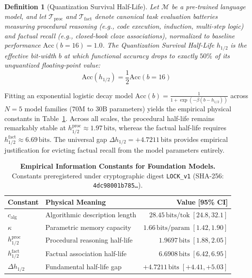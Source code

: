 \documentclass[10pt,twocolumn,letterpaper]{article}
\newtheorem{definition}{Definition}
\begin{document}
\begin{definition}[Quantization Survival Half-Life]
Let $\mathcal{M}$ be a pre-trained language model, and let $\mathcal{T}_{\text{proc}}$ and $\mathcal{T}_{\text{fact}}$ denote canonical task evaluation batteries measuring procedural reasoning (e.g., code execution, induction, multi-step logic) and factual recall (e.g., closed-book cloze associations), normalized to baseline performance $\text{Acc}(b=16) = 1.0$. The Quantization Survival Half-Life $h_{1/2}$ is the effective bit-width $b$ at which functional accuracy drops to exactly $50\%$ of its unquantized floating-point value:
\begin{equation}
    \text{Acc}(h_{1/2}) = \frac{1}{2} \text{Acc}(b=16)
\end{equation}
\end{definition}

Fitting an exponential logistic decay model $\text{Acc}(b) = \frac{1}{1 + \exp(-\beta(b - h_{1/2}))}$ across $N=5$ model families ($70\text{M}$ to $30\text{B}$ parameters) yields the empirical physical constants in Table~\ref{tab:constants}. Across all scales, the procedural half-life remains remarkably stable at $h_{1/2}^{\text{proc}} \approx 1.97\,\text{bits}$, whereas the factual half-life requires $h_{1/2}^{\text{fact}} \approx 6.69\,\text{bits}$. The universal gap $\Delta h_{1/2} = +4.7211\,\text{bits}$ provides empirical justification for evicting factual recall from the model parameters entirely.

\begin{table}[h]
\centering
\small
\caption{\textbf{Empirical Information Constants for Foundation Models.} Constants preregistered under cryptographic digest \texttt{LOCK\_v1} (SHA-256: \texttt{4dc98001b785\dots}).}
\label{tab:constants}
\begin{tabularx}{\columnwidth}{l X r}
\toprule
\textbf{Constant} & \textbf{Physical Meaning} & \textbf{Value [95\% CI]} \\
\midrule
$c_{\text{alg}}$ & Algorithmic description length & $28.45\,\text{bits/tok}\; [24.8, 32.1]$ \\
$\kappa$ & Parametric memory capacity & $1.66\,\text{bits/param}\; [1.42, 1.90]$ \\
$h_{1/2}^{\text{proc}}$ & Procedural reasoning half-life & $1.9697\,\text{bits}\; [1.88, 2.05]$ \\
$h_{1/2}^{\text{fact}}$ & Factual association half-life & $6.6908\,\text{bits}\; [6.42, 6.95]$ \\
$\Delta h_{1/2}$ & Fundamental half-life gap & $+4.7211\,\text{bits}\; [+4.41, +5.03]$ \\
\bottomrule
\end{tabularx}
\end{table}
\end{document}
